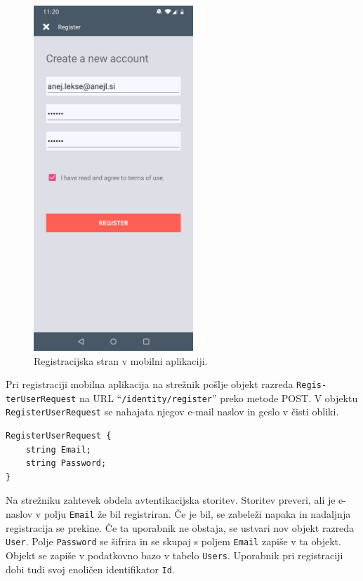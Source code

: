 \documentclass[a4paper, 12pt]{book}
\begin{document}
\begin{figure}[H]
\begin{center}
\includegraphics[width=6cm]{app_register}
\end{center}
	\caption{Registracijska stran v mobilni aplikaciji.}
\label{app_register}
\end{figure}

Pri registraciji mobilna aplikacija na strežnik pošlje objekt razreda \texttt{Regis-\\terUserRequest} na URL \enquote{\texttt{/identity/register}} preko metode POST.
V objektu \texttt{RegisterUserRequest} se nahajata njegov e-mail naslov in geslo v čisti obliki.

\begin{verbatim}
RegisterUserRequest {
    string Email; 
    string Password; 
} 
\end{verbatim}


Na strežniku zahtevek obdela avtentikacijska storitev.
Storitev preveri, ali je e-naslov v polju \texttt{Email} že bil registriran.
Če je bil, se zabeleži napaka in nadaljnja registracija se prekine.
Če ta uporabnik ne obstaja, se ustvari nov objekt razreda \texttt{User}.
Polje \texttt{Password} se šifrira in se skupaj s poljem \texttt{Email} zapiše v ta objekt.
Objekt se zapiše v podatkovno bazo v tabelo \texttt{Users}.
Uporabnik pri registraciji dobi tudi svoj enoličen identifikator \texttt{Id}.
\end{document}
